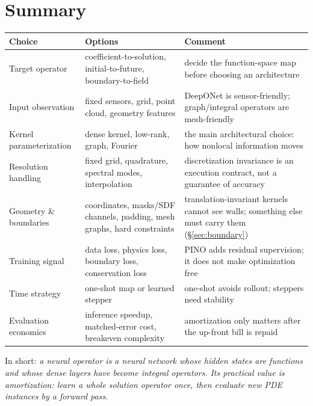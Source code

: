 \documentclass[10pt,a4paper]{article}
\begin{document}
\section{Summary}

\begin{center}
\footnotesize
\begin{tabular}{@{}>{\raggedright\arraybackslash}p{2.9cm}>{\raggedright\arraybackslash}p{5.4cm}>{\raggedright\arraybackslash}p{6.6cm}@{}}
\toprule
Choice & Options & Comment \\
\midrule
Target operator & coefficient-to-solution, initial-to-future,
boundary-to-field & decide the function-space map before choosing an
architecture \\
Input observation & fixed sensors, grid, point cloud, geometry features &
DeepONet is sensor-friendly; graph/integral operators are mesh-friendly \\
Kernel parameterization & dense kernel, low-rank, graph, Fourier & the main
architectural choice: how nonlocal information moves \\
Resolution handling & fixed grid, quadrature, spectral modes, interpolation &
discretization invariance is an execution contract, not a guarantee of
accuracy \\
Geometry \& boundaries & coordinates, masks/SDF channels, padding, mesh
graphs, hard constraints & translation-invariant kernels cannot see walls;
something else must carry them (\S\ref{sec:boundary}) \\
Training signal & data loss, physics loss, boundary loss, conservation loss &
PINO adds residual supervision; it does not make optimization free \\
Time strategy & one-shot map or learned stepper & one-shot avoids rollout;
steppers need stability \\
Evaluation economics & inference speedup, matched-error cost, breakeven
complexity & amortization only matters after the up-front bill is repaid \\
\bottomrule
\end{tabular}
\end{center}

\medskip
In short: \emph{a neural operator is a neural network whose hidden
states are functions and whose dense layers have become integral operators.}
\emph{Its practical value is amortization: learn a whole solution operator
once, then evaluate new PDE instances by a forward pass.}
\end{document}
